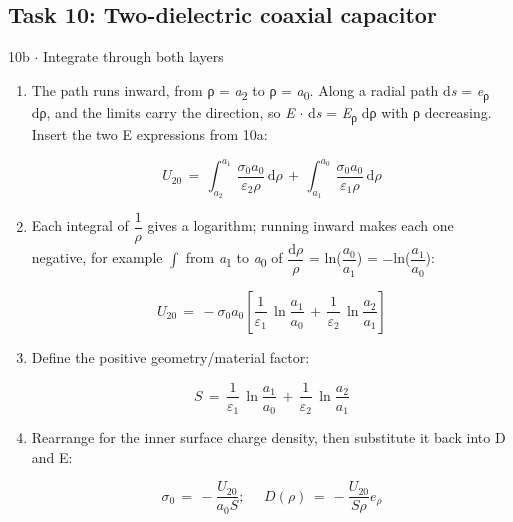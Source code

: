 \documentclass[11pt]{article}
\begin{document}
\begin{keepsection}\subsection{Task 10: Two-dielectric coaxial capacitor}

\begin{workedbox}{10b \ensuremath{\cdot} Integrate through both layers}
\begin{enumerate}
\item {}
The path runs inward, from ρ = \textit{a}\textsubscript{2} to ρ = \textit{a}\textsubscript{0}. Along a radial path d\textit{s} = \textit{e}\textsubscript{ρ} dρ, and the limits carry the direction, so \textit{E} \ensuremath{\cdot} d\textit{s} = \textit{E}\textsubscript{ρ} dρ with ρ decreasing. Insert the two E expressions from 10a:

\begin{equation*}{U}_{20}\, =\, \int_{{a}_{2}}^{{a}_{1}} \, \dfrac{σ_{0}{a}_{0}}{ε_{2}ρ}\, \mathrm{d}ρ\, +\, \int_{{a}_{1}}^{{a}_{0}} \, \dfrac{σ_{0}{a}_{0}}{ε_{1}ρ}\, \mathrm{d}ρ\end{equation*}
\item {}
Each integral of {\small\ensuremath{\dfrac{1}{ρ}}} gives a logarithm; running inward makes each one negative, for example $\int $ from \textit{a}\textsubscript{1} to \textit{a}\textsubscript{0} of {\small\ensuremath{\dfrac{\mathrm{d}ρ}{ρ}}} = ln({\small\ensuremath{\dfrac{{a}_{0}}{{a}_{1}}}}) = \ensuremath{-}ln({\small\ensuremath{\dfrac{{a}_{1}}{{a}_{0}}}}):

\begin{equation*}{U}_{20}\, =\, -σ_{0}{a}_{0}\left[\dfrac{1}{ε_{1}}\, \ln \dfrac{{a}_{1}}{{a}_{0}}\, +\, \dfrac{1}{ε_{2}}\, \ln \dfrac{{a}_{2}}{{a}_{1}}\right]\end{equation*}
\item {}
Define the positive geometry/material factor:

\begin{equation*}{S}\, =\, \dfrac{1}{ε_{1}}\, \ln \dfrac{{a}_{1}}{{a}_{0}}\, +\, \dfrac{1}{ε_{2}}\, \ln \dfrac{{a}_{2}}{{a}_{1}}\end{equation*}
\item {}
Rearrange for the inner surface charge density, then substitute it back into D and E:

\begin{equation*}σ_{0}\, =\, -\dfrac{{U}_{20}}{{a}_{0}{S}};\, \quad \, {D}(ρ)\, =\, -\dfrac{{U}_{20}}{{S}ρ}{e}_{ρ}\end{equation*}


\end{enumerate}
\end{workedbox}
\end{keepsection}
\end{document}
